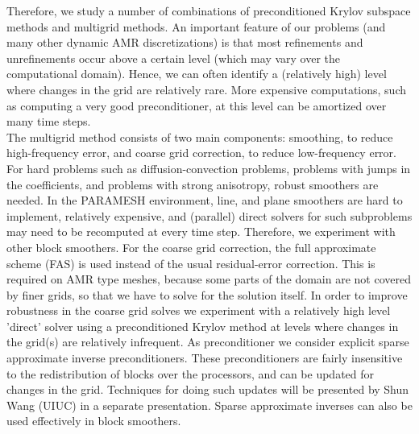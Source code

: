 \documentclass{report}
\begin{document}
Therefore, we study a number of combinations of
preconditioned Krylov subspace methods and multigrid methods. An important feature
of our problems (and many other dynamic AMR discretizations) is that most refinements
and unrefinements occur above a certain level (which may vary over the computational
domain). Hence, we can often identify a (relatively high) level where changes in the
grid are relatively rare. More expensive computations, such as computing a very good
preconditioner, at this level can be amortized over many time steps.\\

The multigrid method consists of two main components: smoothing,
to reduce high-frequency error, and coarse
grid correction, to reduce low-frequency error. For hard problems such as
diffusion-convection problems, problems with
jumps in the coefficients, and problems with strong anisotropy,
robust smoothers are needed. In the PARAMESH environment, line, and plane
smoothers are hard to implement, relatively expensive, and (parallel)
direct solvers
for such subproblems may need to be recomputed at every time step.
Therefore, we experiment with other block smoothers.
For the coarse grid correction, the full approximate scheme (FAS) is used
instead of the usual residual-error correction. This is required
on AMR type meshes, because some parts of the domain are not
covered by finer grids, so that we have to solve for the solution
itself. In order to improve robustness in the coarse grid solves
we experiment with a relatively high level 'direct' solver using a
preconditioned Krylov method at levels where changes in the grid(s) are
relatively infrequent. As preconditioner we consider explicit
sparse approximate inverse preconditioners. These preconditioners are fairly
insensitive to the redistribution of blocks over the processors, and can
be updated for changes in the grid. Techniques for doing such updates will be
presented by Shun Wang (UIUC) in a separate presentation. Sparse approximate
inverses can also be used effectively in block smoothers.\\
\end{document}
